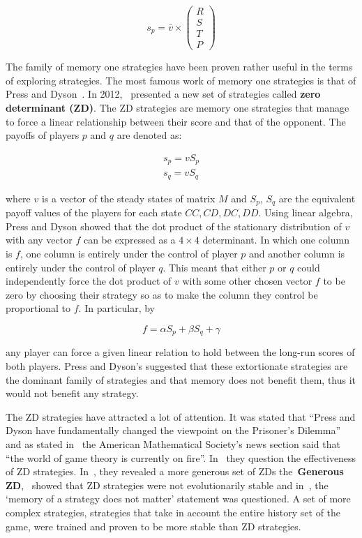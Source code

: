 \documentclass{article}
\theoremstyle{definition}
\begin{document}
\[s_p = \bar{v} \times \begin{pmatrix} R \\ S \\ T \\ P \end{pmatrix}\]

The family of memory one strategies have been proven rather useful in the terms
of exploring strategies. The most famous work of memory one strategies is that
of Press and Dyson~\cite{Press2012}.
In 2012,~\cite{Press2012} presented
a new set of strategies called \textbf{zero determinant (ZD)}. The ZD strategies
are memory one strategies that manage to force a linear relationship between their
score and that of the opponent. The payoffs of players \(p\) and \(q\) are denoted
as:

\begin{align*}
    s_p = v S_p \\
    s_q = v S_q
\end{align*}

where \(v\) is a vector of the steady states of matrix \(M\) and \(S_p\), \(S_q\)
are the equivalent payoff values of the players for each state \(CC, CD, DC, DD\).
Using linear algebra, Press and Dyson showed that the dot product of the stationary
distribution of \(v\) with any vector \(f\) can be expressed as a \(4\times 4\)
determinant. In which one column is \(f\), one column is entirely under the control
of player \(p\) and another column is entirely under the control of player \(q\).
This meant that either \(p\) or \(q\) could independently force the dot product
of \(v\) with some other chosen vector \(f\) to be zero by choosing their
strategy so as to make the column they control be proportional to \(f\).
In particular, by

\begin{equation}\label{eq:exortion}
    f = \alpha S_p + \beta S_q + \gamma
\end{equation}

any player can force a given linear relation to hold between the long-run scores
of both players. Press and Dyson's suggested that these extortionate strategies
are the dominant family of strategies and that memory does not benefit them,
thus it would not benefit any strategy.

The ZD strategies have attracted a lot of attention. It was stated that
``Press and Dyson have fundamentally changed the viewpoint on the Prisoner's
Dilemma''~\cite{Stewart2012} and as stated in~\cite{hilbe2015} the American
Mathematical Society's news section said that ``the world of game theory is currently on fire''.
In~\cite{Adami2013, Hilbe2013b, Hilbe2013, hilbe2015, KnightHGC17,
Lee2015, Stewart2012} they question the effectiveness of ZD strategies. In~\cite{Stewart2012},
they revealed a more generous set of ZDs the~\textbf{Generous ZD},~\cite{Adami2013}
showed that ZD strategies were not evolutionarily stable and
in~\cite{Lee2015}, the `memory of a strategy does not matter' statement was
questioned. A set of more complex strategies, strategies that take in account
the entire history set of the game, were trained and proven to be more stable than
ZD strategies.
\end{document}
